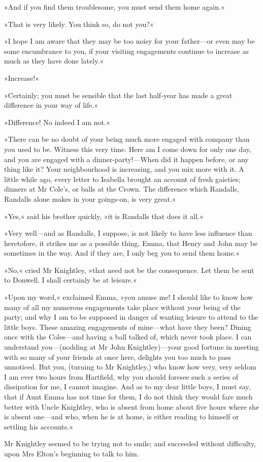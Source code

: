 »And if you find them troublesome, you must send them home again.«

»That is very likely. You think so, do not you?«

»I hope I am aware that they may be too noisy for your father—or even may be some encumbrance to you, if your visiting engagements continue to increase as much as they have done lately.«

»Increase!«

»Certainly; you must be sensible that the last half-year has made a great difference in your way of life.«

»Difference! No indeed I am not.«

»There can be no doubt of your being much more engaged with company than you used to be. Witness this very time. Here am I come down for only one day, and you are engaged with a dinner-party!—When did it happen before, or any thing like it? Your neighbourhood is increasing, and you mix more with it. A little while ago, every letter to Isabella brought an account of fresh gaieties; dinners at Mr Cole's, or balls at the Crown. The difference which Randalls, Randalls alone makes in your goings-on, is very great.«

»Yes,« said his brother quickly, »it is Randalls that does it all.«

»Very well—and as Randalls, I suppose, is not likely to have less influence than heretofore, it strikes me as a possible thing, Emma, that Henry and John may be sometimes in the way. And if they are, I only beg you to send them home.«

»No,« cried Mr Knightley, »that need not be the consequence. Let them be sent to Donwell. I shall certainly be at leisure.«

»Upon my word,« exclaimed Emma, »you amuse me! I should like to know how many of all my numerous engagements take place without your being of the party; and why I am to be supposed in danger of wanting leisure to attend to the little boys. These amazing engagements of mine—what have they been? Dining once with the Coles—and having a ball talked of, which never took place. I can understand you—(nodding at Mr John Knightley)—your good fortune in meeting with so many of your friends at once here, delights you too much to pass unnoticed. But you, (turning to Mr Knightley,) who know how very, very seldom I am ever two hours from Hartfield, why you should foresee such a series of dissipation for me, I cannot imagine. And as to my dear little boys, I must say, that if Aunt Emma has not time for them, I do not think they would fare much better with Uncle Knightley, who is absent from home about five hours where she is absent one—and who, when he is at home, is either reading to himself or settling his accounts.«

Mr Knightley seemed to be trying not to smile; and succeeded without difficulty, upon Mrs Elton's beginning to talk to him.